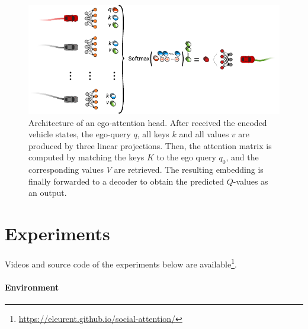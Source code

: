 \begin{figure}[tp]
%	
%	
	\includegraphics[width=\linewidth]{img/ego_attention}
	\caption{Architecture of an ego-attention head. After received the encoded vehicle states, the ego-query $q$, all keys $k$ and all values $v$ are produced by three linear projections. Then, the attention matrix is computed by matching the keys $K$ to the ego query $q_0$, and the corresponding values $V$ are retrieved. The resulting embedding is finally forwarded to a decoder to obtain the predicted $Q$-values as an output.}
	\label{fig:ego-attention}
\end{figure}

\section{Experiments}

Videos and source code of the experiments below are available\footnote{\href{https://eleurent.github.io/social-attention/}{https://eleurent.github.io/social-attention/}}.

\paragraph{Environment}

